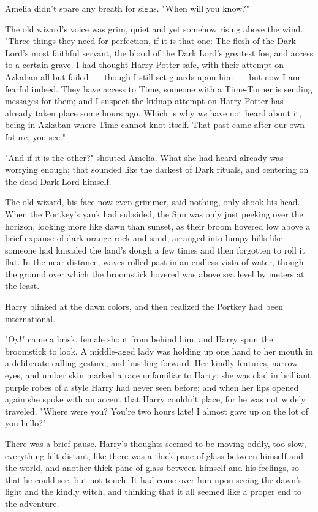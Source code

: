 Amelia didn't spare any breath for sighs. "When will you know?"

The old wizard's voice was grim, quiet and yet somehow rising above the wind.
"Three things they need for perfection, if it is that one: The flesh of the
Dark Lord's most faithful servant, the blood of the Dark Lord's greatest foe,
and access to a certain grave. I had thought Harry Potter safe, with their
attempt on Azkaban all but failed~--- though I still set guards upon him~--- but
now I am fearful indeed. They have access to Time, someone with a Time-Turner
is sending messages for them; and I suspect the kidnap attempt on Harry Potter
has already taken place some hours ago. Which is why \emph{we} have not heard
about it, being in Azkaban where Time cannot knot itself. That past came after
our own future, you see."

"And if it is the other?" shouted Amelia. What she had heard already was
worrying enough; that sounded like the darkest of Dark rituals, and centering
on the dead Dark Lord himself.

The old wizard, his face now even grimmer, said nothing, only shook his head.
\sbreak
When the Portkey's yank had subsided, the Sun was only just peeking over the
horizon, looking more like dawn than sunset, as their broom hovered low above a
brief expanse of dark-orange rock and sand, arranged into lumpy hills like
someone had kneaded the land's dough a few times and then forgotten to roll it
flat. In the near distance, waves rolled past in an endless vista of water,
though the ground over which the broomstick hovered was above sea level by
meters at the least.

Harry blinked at the dawn colors, and then realized the Portkey had been
international.

"Oy!" came a brisk, female shout from behind him, and Harry spun the broomstick
to look. A middle-aged lady was holding up one hand to her mouth in a
deliberate calling gesture, and bustling forward. Her kindly features, narrow
eyes, and umber skin marked a race unfamiliar to Harry; she was clad in
brilliant purple robes of a style Harry had never seen before; and when her
lips opened again she spoke with an accent that Harry couldn't place, for he
was not widely traveled. "Where were you? You're two hours late! I almost gave
up on the lot of you{\el} hello?"

There was a brief pause. Harry's thoughts seemed to be moving oddly, too slow,
everything felt distant, like there was a thick pane of glass between himself
and the world, and another thick pane of glass between himself and his
feelings, so that he could see, but not touch. It had come over him upon seeing
the dawn's light and the kindly witch, and thinking that it all seemed like a
proper end to the adventure.


